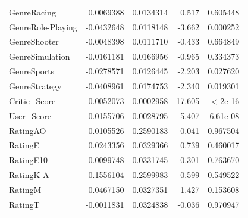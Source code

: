 \documentclass[12pt]{article}
\begin{document}
\begin{table}[ht]
\begin{tabular}{lrrrr}
$$GenreRacing & 0.0069388 & 0.0134314 & 0.517 & 0.605448  \\
GenreRole-Playing & -0.0432648 & 0.0118148 & -3.662 & 0.000252   \\
GenreShooter & -0.0048398 & 0.0111710 & -0.433 & 0.664849  \\
GenreSimulation & -0.0161181 & 0.0166956 & -0.965 & 0.334373  \\
GenreSports & -0.0278571 & 0.0126445 & -2.203 & 0.027620   \\
GenreStrategy & -0.0408961 & 0.0174753 & -2.340 & 0.019301   \\
Critic\_Score & 0.0052073 & 0.0002958 & 17.605 & < 2e-16   \\
User\_Score & -0.0155706 & 0.0028795 & -5.407 & 6.61e-08   \\
RatingAO & -0.0105526 & 0.2590183 & -0.041 & 0.967504  \\
RatingE & 0.0243356 & 0.0329366 & 0.739 & 0.460017  \\
RatingE10+ & -0.0099748 & 0.0331745 & -0.301 & 0.763670  \\
RatingK-A & -0.1556104 & 0.2599983 & -0.599 & 0.549522  \\
RatingM & 0.0467150 & 0.0327351 & 1.427 & 0.153608  \\
RatingT & -0.0011831 & 0.0324838 & -0.036 & 0.970947 \\
 \hline
\end{tabular}
\end{table}
\end{document}
